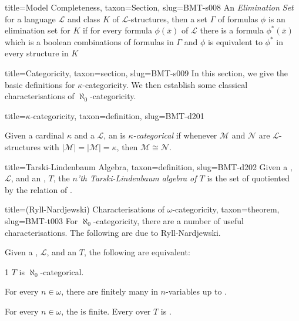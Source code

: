 \documentclass[a4paper]{article}
\begin{document}
  
  
\begin{tree}{title={Model Completeness}, taxon={Section}, slug={BMT-s008}}
An \emph{Elimination Set} for a language \(\mathcal {L}\) and class \(K\) of \(\mathcal {L}\)-structures, then a set \(\Gamma\) of formulas \(\phi\) is an elimination set for \(K\) if for every formula \(\phi ( \bar {x})\) of \(\mathcal {L}\) there is a formula \(\phi ^*( \bar {x})\) which is a boolean combinations of formulas in \(\Gamma\) and \(\phi\) is equivalent to \(\phi ^*\) in every structure in \(K\)
\end{tree}


  
  
\begin{tree}{title={Categoricity}, taxon={section}, slug={BMT-s009}}
In this section, we give the basic definitions for \(\kappa\)-categoricity. We then establish some classical characterisations of \(\aleph _0\)-categoricity.
\begin{tree}{title={\(\kappa\)-categoricity}, taxon={definition}, slug={BMT-d201}}

    Given a cardinal \(\kappa\) and a  \(\mathcal {L}\), an  is \emph{\(\kappa\)-categorical} if whenever \(\mathcal {M}\) and \(\mathcal {N}\) are \(\mathcal {L}\)-structures with \(| \mathcal {M}|=| \mathcal {M}|= \kappa\), then \(\mathcal {M}  \cong   \mathcal {N}\). 

\end{tree}

\begin{tree}{title={Tarski-Lindenbaum Algebra}, taxon={definition}, slug={BMT-d202}}
Given a , \(\mathcal {L}\), and an , \(T\), the \emph{\(n\)'th Tarski-Lindenbaum algebra of \(T\)} is the set of  quotiented by the relation of .
\end{tree}

\begin{tree}{title={(Ryll-Nardjewski) Characterisations of \(\omega\)-categoricity}, taxon={theorem}, slug={BMT-t003}}
For \(\aleph _0\)-categoricity, there are a number of useful characterisations. The following are due to Ryll-Nardjewski.\par{Given a , \(\mathcal {L}\), and an  \(T\), the following are equivalent:}\par{1 \(T\) is \(\aleph _0\)-categorical.}\par{For every \(n \in   \omega\), there are finitely many  in \(n\)-variables up to .}\par{For every \(n \in   \omega\), the  is finite. 
Every  over \(T\) is . }
\end{tree}

\end{tree}
\end{document}
